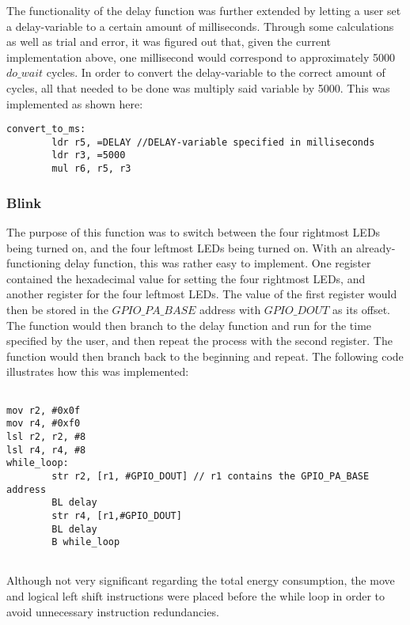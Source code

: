 The functionality of the delay function was further extended by letting a user set a delay-variable to a certain amount of milliseconds. Through some calculations as well as trial and error, it was figured out that, given the current implementation above, one millisecond would correspond to approximately 5000 $do\_wait$ cycles. In order to convert the delay-variable to the correct amount of cycles, all that needed to be done was multiply said variable by 5000. This was implemented as shown here:

\begin{lstlisting}
convert_to_ms:
        ldr r5, =DELAY //DELAY-variable specified in milliseconds
        ldr r3, =5000
        mul r6, r5, r3
\end{lstlisting}


\subsubsection{Blink}

The purpose of this function was to switch between the four rightmost LEDs being turned on, and the four leftmost LEDs being turned on. With an already-functioning delay function, this was rather easy to implement. One register contained the hexadecimal value for setting the four rightmost LEDs, and another register for the four leftmost LEDs. The value of the first register would then be stored in the $GPIO\_PA\_BASE$ address with $GPIO\_DOUT$ as its offset. The function would then branch to the delay function and run for the time specified by the user, and then repeat the process with the second register. The function would then branch back to the beginning and repeat. The following code illustrates how this was implemented:
\begin{lstlisting}

mov r2, #0x0f
mov r4, #0xf0
lsl r2, r2, #8
lsl r4, r4, #8
while_loop:
        str r2, [r1, #GPIO_DOUT] // r1 contains the GPIO_PA_BASE address
        BL delay
        str r4, [r1,#GPIO_DOUT]
        BL delay
        B while_loop


\end{lstlisting}

Although not very significant regarding the total energy consumption, the move and logical left shift instructions were placed before the while loop in order to avoid unnecessary instruction redundancies.

